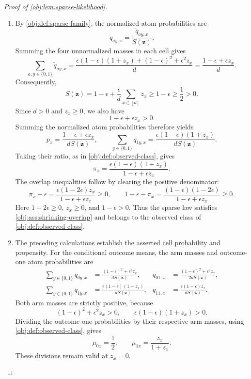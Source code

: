 \documentclass[11pt]{article}
\begin{document}
\begin{proof}[Proof of \cref{obj:lem:sparse-likelihood}]
\begin{enumerate}
\item By \cref{obj:def:sparse-family}, the normalized atom probabilities are
\[
q_{ay,x}=\frac{\widetilde q_{ay,x}}{S(\mathbf z)}.
\]
Summing the four unnormalized masses in each cell gives
\[
\sum_{a,y\in\{0,1\}}\widetilde q_{ay,x}
=\frac{\epsilon(1-\epsilon)(1+z_x)+(1-\epsilon)^2+\epsilon^2z_x}{d}
=\frac{1-\epsilon+\epsilon z_x}{d}.
\]
Consequently,
\[
S(\mathbf z)
=1-\epsilon+\frac{\epsilon}{d}\sum_{x\in[d]}z_x
\ge 1-\epsilon\ge\frac12>0.
\]
Since \(d>0\) and \(z_x\ge0\), we also have
\[
1-\epsilon+\epsilon z_x>0.
\]
Summing the normalized atom probabilities therefore yields
\[
p_x=\frac{1-\epsilon+\epsilon z_x}{dS(\mathbf z)},
\qquad
\sum_{y\in\{0,1\}}q_{1y,x}
=\frac{\epsilon(1-\epsilon)(1+z_x)}{dS(\mathbf z)}.
\]
Taking their ratio, as in \cref{obj:def:observed-class}, gives
\[
\pi_x
=\frac{\epsilon(1-\epsilon)(1+z_x)}
{1-\epsilon+\epsilon z_x}.
\]
The overlap inequalities follow by clearing the positive denominator:
\[
\pi_x-\epsilon
=\frac{\epsilon(1-2\epsilon)z_x}{1-\epsilon+\epsilon z_x}\ge0,
\qquad
1-\epsilon-\pi_x
=\frac{(1-\epsilon)(1-2\epsilon)}
{1-\epsilon+\epsilon z_x}\ge0.
\]
Here \(1-2\epsilon\ge0\), \(z_x\ge0\), and \(1-\epsilon>0\).
Thus the sparse law satisfies \cref{obj:ass:shrinking-overlap} and belongs to the observed class of \cref{obj:def:observed-class}.

\item The preceding calculations establish the asserted cell probability and propensity. For the conditional outcome means, the arm masses and outcome-one atom probabilities are
\[
\begin{aligned}
\sum_{y\in\{0,1\}}q_{0y,x}
&=\frac{(1-\epsilon)^2+\epsilon^2z_x}{dS(\mathbf z)},
&
q_{01,x}
&=\frac{(1-\epsilon)^2+\epsilon^2z_x}{2dS(\mathbf z)},\\
\sum_{y\in\{0,1\}}q_{1y,x}
&=\frac{\epsilon(1-\epsilon)(1+z_x)}{dS(\mathbf z)},
&
q_{11,x}
&=\frac{\epsilon(1-\epsilon)z_x}{dS(\mathbf z)}.
\end{aligned}
\]
Both arm masses are strictly positive, because
\[
(1-\epsilon)^2+\epsilon^2z_x>0,
\qquad
\epsilon(1-\epsilon)(1+z_x)>0.
\]
Dividing the outcome-one probabilities by their respective arm masses, using \cref{obj:def:observed-class}, gives
\[
\mu_{0x}=\frac12,
\qquad
\mu_{1x}=\frac{z_x}{1+z_x}.
\]
These divisions remain valid at \(z_x=0\).


\end{enumerate}
\end{proof}
\end{document}
